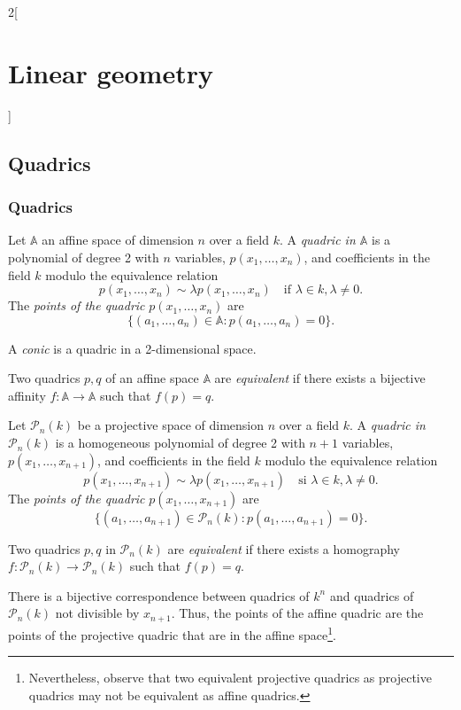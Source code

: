 \documentclass[../../../main.tex]{subfiles}
\begin{document}
\begin{multicols}{2}[\section{Linear geometry}]
\subsection{Quadrics}
\subsubsection*{Quadrics}
\begin{definition}
Let $\mathbb{A}$ an affine space of dimension $n$ over a field $k$. A \textit{quadric in $\mathbb{A}$} is a polynomial of degree 2 with $n$ variables, $p(x_1,\ldots,x_n)$, and coefficients in the field $k$ modulo the equivalence relation $$p(x_1,\ldots,x_n)\sim\lambda p(x_1,\ldots,x_n)\quad\text{if }\lambda\in k,\lambda\ne0.$$ The \textit{points of the quadric} $p(x_1,\ldots,x_n)$ are $$\{(a_1,\ldots,a_n)\in\mathbb{A}:p(a_1,\ldots,a_n)=0\}.$$
\end{definition}
\begin{definition}
A \textit{conic} is a quadric in a 2-dimensional space.
\end{definition}
\begin{definition}
Two quadrics $p,q$ of an affine space $\mathbb{A}$ are \textit{equivalent} if there exists a bijective affinity $f:\mathbb{A}\rightarrow\mathbb{A}$ such that $f(p)=q$.
\end{definition}
\begin{definition}
Let $\mathcal{P}_n(k)$ be a projective space of dimension $n$ over a field $k$. A \textit{quadric in $\mathcal{P}_n(k)$} is a homogeneous polynomial of degree 2 with $n+1$ variables, $p(x_1,\ldots,x_{n+1})$, and coefficients in the field $k$ modulo the equivalence relation $$p(x_1,\ldots,x_{n+1})\sim\lambda p(x_1,\ldots,x_{n+1})\quad\text{si }\lambda\in k,\lambda\ne0.$$ The \textit{points of the quadric} $p(x_1,\ldots,x_{n+1})$ are $$\{(a_1,\ldots,a_{n+1})\in\mathcal{P}_n(k):p(a_1,\ldots,a_{n+1})=0\}.$$
\end{definition}
\begin{definition}
Two quadrics $p,q$ in $\mathcal{P}_n(k)$ are \textit{equivalent} if there exists a homography $f:\mathcal{P}_n(k)\rightarrow\mathcal{P}_n(k)$ such that $f(p)=q$.
\end{definition}
\begin{theorem}
There is a bijective correspondence between quadrics of $k^n$ and quadrics of $\mathcal{P}_n(k)$ not divisible by $x_{n+1}$. Thus, the points of the affine quadric are the points of the projective quadric that are in the affine space\footnote{Nevertheless, observe that two equivalent projective quadrics as projective quadrics may not be equivalent as affine quadrics.}.

\end{theorem}
\end{multicols}
\end{document}
